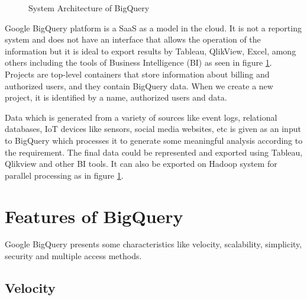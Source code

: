 \documentclass[9pt,twocolumn,twoside]{../../styles/osajnl}
\begin{document}
\begin{figure}[htbp]
\centering
{}
\caption{\cite{www-bigquery-slideshare} System Architecture of BigQuery}
\label{fig:architecture}
\end{figure}

\noindent
Google BigQuery \cite{bigquery-paper} platform is a SaaS as a model in
the cloud. It is not a reporting system and does not have an interface
that allows the operation of the information but it is ideal to export
results by Tableau, QlikView, Excel, among others including the tools
of Business Intelligence (BI) as seen in figure
\ref{fig:architecture}. Projects are top-level containers that store
information about billing and authorized users, and they contain
BigQuery data. When we create a new project, it is identified by a
name, authorized users and data\cite{www-bigquery-documentation}.

\noindent
Data which is generated from a variety of sources like event logs,
relational databases, IoT devices like sensors, social media websites,
etc is given as an input to BigQuery which processes it to generate
some meaningful analysis according to the requirement. The final data
could be represented and exported using Tableau, Qlikview and other BI
tools. It can also be exported on Hadoop system for parallel
processing as in figure \ref{fig:architecture}.

\section{Features of BigQuery}
Google BigQuery\cite{www-bigquery} presents some characteristics like velocity,
scalability, simplicity, security and multiple access methods.

\subsection{Velocity}
\end{document}
